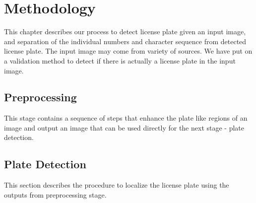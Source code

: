 \documentclass{standalone}
\begin{document}
\chapter{Methodology}
This chapter describes our process to detect license plate given an input image, and separation of the individual numbers and character sequence from detected license plate. The input image may come from variety of sources. We have put on a validation method to detect if there is actually a license plate in the input image.

  
  

\section{Preprocessing}
This stage contains a sequence of steps that enhance the plate like regions of an image and output an image that can be used directly for the next stage - plate detection.

  
  
  
  
  
  
  

\section{Plate Detection}
This section describes the procedure to localize the license plate using the outputs from preprocessing stage. 
  
  
  
  
  




\end{document}
